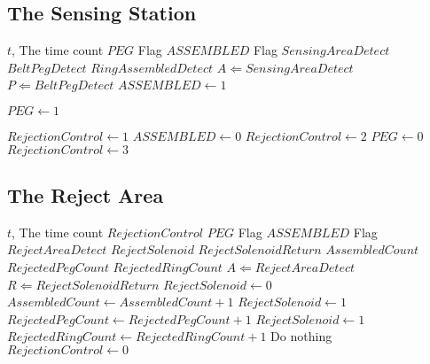 \documentclass[12pt]{article}
\makeatletter
\newcommand*{\currentname}{\@currentlabelname}
\makeatother
\begin{document}
  \subsection{The Sensing Station}
    \begin{algorithm}[H]
      \caption{\currentname}
      \begin{algorithmic}
        \REQUIRE $t$, The time count
        \REQUIRE $PEG$ Flag
        \REQUIRE $ASSEMBLED$ Flag
        \REQUIRE $SensingAreaDetect$
        \REQUIRE $BeltPegDetect$
        \REQUIRE $RingAssembledDetect$
        \STATE $A \Leftarrow SensingAreaDetect$
        \STATE $P \Leftarrow BeltPegDetect$
            \STATE $ASSEMBLED \leftarrow 1$
          \ENDIF

            \STATE $PEG \leftarrow 1$
          \ENDIF

              \STATE $RejectionControl \leftarrow 1$
              \STATE $ASSEMBLED \leftarrow 0$
                \STATE $RejectionControl \leftarrow 2$
                \STATE $PEG \leftarrow 0$
                \STATE $RejectionControl \leftarrow 3$              
              \ENDIF
            \ENDIF
          \ENDIF
        \ENDWHILE        
      \end{algorithmic}
    \end{algorithm}

  \subsection{The Reject Area}
    \begin{algorithm}[H]
      \caption{\currentname}
      \begin{algorithmic}
        \REQUIRE $t$, The time count
        \REQUIRE $RejectionControl$
        \REQUIRE $PEG$ Flag
        \REQUIRE $ASSEMBLED$ Flag
        \REQUIRE $RejectAreaDetect$
        \REQUIRE $RejectSolenoid$
        \REQUIRE $RejectSolenoidReturn$
        \REQUIRE $AssembledCount$
        \REQUIRE $RejectedPegCount$
        \REQUIRE $RejectedRingCount$
        \STATE $A \Leftarrow RejectAreaDetect$
        \STATE $R \Leftarrow RejectSolenoidReturn$
              \STATE $RejectSolenoid \leftarrow 0$
              \STATE $AssembledCount \leftarrow AssembledCount + 1$
              \STATE $RejectSolenoid \leftarrow 1$
              \STATE $RejectedPegCount \leftarrow RejectedPegCount + 1$
              \STATE $RejectSolenoid \leftarrow 1$
              \STATE $RejectedRingCount \leftarrow RejectedRingCount + 1$
              \STATE Do nothing
            \ENDIF
            \STATE $RejectionControl \leftarrow 0$
          \ENDIF
        \ENDWHILE
      \end{algorithmic}
    \end{algorithm}
\end{document}
